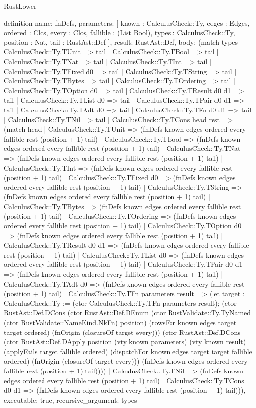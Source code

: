 \begin{lexlean}{RustLower}
\begin{semanticmodule}
definition{
  name: fnDefs,
  parameters: [
    known : CalculusCheck::Ty,
    edges : Edges,
    ordered : Clos,
    every : Clos,
    fallible : (List Bool),
    types : CalculusCheck::Ty,
    position : Nat,
    tail : RustAst::Def
  ],
  result: RustAst::Def,
  body: (match types
    | CalculusCheck::Ty.TUnit => tail
    | CalculusCheck::Ty.TBool => tail
    | CalculusCheck::Ty.TNat => tail
    | CalculusCheck::Ty.TInt => tail
    | CalculusCheck::Ty.TFixed d0 => tail
    | CalculusCheck::Ty.TString => tail
    | CalculusCheck::Ty.TBytes => tail
    | CalculusCheck::Ty.TOrdering => tail
    | CalculusCheck::Ty.TOption d0 => tail
    | CalculusCheck::Ty.TResult d0 d1 => tail
    | CalculusCheck::Ty.TList d0 => tail
    | CalculusCheck::Ty.TPair d0 d1 => tail
    | CalculusCheck::Ty.TAdt d0 => tail
    | CalculusCheck::Ty.TFn d0 d1 => tail
    | CalculusCheck::Ty.TNil => tail
    | CalculusCheck::Ty.TCons head rest => (match head
      | CalculusCheck::Ty.TUnit => (fnDefs known edges ordered every fallible rest (position + 1) tail)
      | CalculusCheck::Ty.TBool => (fnDefs known edges ordered every fallible rest (position + 1) tail)
      | CalculusCheck::Ty.TNat => (fnDefs known edges ordered every fallible rest (position + 1) tail)
      | CalculusCheck::Ty.TInt => (fnDefs known edges ordered every fallible rest (position + 1) tail)
      | CalculusCheck::Ty.TFixed d0 => (fnDefs known edges ordered every fallible rest (position + 1) tail)
      | CalculusCheck::Ty.TString => (fnDefs known edges ordered every fallible rest (position + 1) tail)
      | CalculusCheck::Ty.TBytes => (fnDefs known edges ordered every fallible rest (position + 1) tail)
      | CalculusCheck::Ty.TOrdering => (fnDefs known edges ordered every fallible rest (position + 1) tail)
      | CalculusCheck::Ty.TOption d0 => (fnDefs known edges ordered every fallible rest (position + 1) tail)
      | CalculusCheck::Ty.TResult d0 d1 => (fnDefs known edges ordered every fallible rest (position + 1) tail)
      | CalculusCheck::Ty.TList d0 => (fnDefs known edges ordered every fallible rest (position + 1) tail)
      | CalculusCheck::Ty.TPair d0 d1 => (fnDefs known edges ordered every fallible rest (position + 1) tail)
      | CalculusCheck::Ty.TAdt d0 => (fnDefs known edges ordered every fallible rest (position + 1) tail)
      | CalculusCheck::Ty.TFn parameters result => (let target : CalculusCheck::Ty := (ctor CalculusCheck::Ty.TFn parameters result); (ctor RustAst::Def.DCons (ctor RustAst::Def.DEnum (ctor RustValidate::Ty.TyNamed (ctor RustValidate::NameKind.NkFn) position) (rowsFor known edges target target ordered) (fnOrigin (closureOf target every))) (ctor RustAst::Def.DCons (ctor RustAst::Def.DApply position (vty known parameters) (vty known result) (applyFails target fallible ordered) (dispatchFor known edges target target fallible ordered) (fnOrigin (closureOf target every))) (fnDefs known edges ordered every fallible rest (position + 1) tail))))
      | CalculusCheck::Ty.TNil => (fnDefs known edges ordered every fallible rest (position + 1) tail)
      | CalculusCheck::Ty.TCons d0 d1 => (fnDefs known edges ordered every fallible rest (position + 1) tail))),
  executable: true,
  recursive_argument: types
}


\end{semanticmodule}
\end{lexlean}
